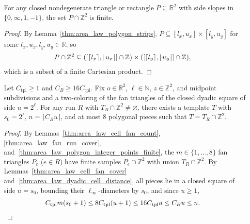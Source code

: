\begin{lemma}
    \label{thm:area_law_polygon_integer_points_finite}
    \leanok
    For any closed nondegenerate triangle or rectangle $P\subseteq\mathbb R^2$ with side slopes in $\{0,\infty,1,-1\}$, the set $P\cap\mathbb Z^2$ is finite.
\end{lemma}

\begin{proof}
    \leanok
    By Lemma~\ref{thm:area_law_polygon_strips}, $P\subseteq[l_x,u_x]\times[l_y,u_y]$ for some $l_x,u_x,l_y,u_y\in\mathbb R$, so
    \begin{align}
        P\cap\mathbb Z^2 & \subseteq
        ([\lceil l_x\rceil,\lfloor u_x\rfloor]\cap\mathbb Z)
        \times([\lceil l_y\rceil,\lfloor u_y\rfloor]\cap\mathbb Z),\notag
    \end{align}
    which is a subset of a finite Cartesian product.
\end{proof}

\begin{lemma}
    \label{thm:area_law_fan_run_template}
    \leanok
    Let $C_{\mathrm{tpl}}\ge1$ and $C_B\ge16C_{\mathrm{tpl}}$. Fix $o\in\mathbb R^2$, $\ell\in\mathbb N$, $z\in\mathbb Z^2$, and midpoint subdivisions and a two-coloring of the fan triangles of the closed dyadic square of side $u=2^\ell$. For any run $R$ with $T_R\cap\mathbb Z^2\ne\varnothing$, there exists a template $T$ with $s_0=2^\ell$, $n=\lceil C_Bu\rceil$, and at most $8$ polygonal pieces such that $T=T_R\cap\mathbb Z^2$.
\end{lemma}

\begin{proof}
    \leanok
    By Lemmas~\ref{thm:area_law_cell_fan_count}, \ref{thm:area_law_fan_run_cover}, and~\ref{thm:area_law_polygon_integer_points_finite}, the $m\in\{1,\ldots,8\}$ fan triangles $P_e$ ($e\in R$) have finite samples $P_e\cap\mathbb Z^2$ with union $T_R\cap\mathbb Z^2$. By Lemmas~\ref{thm:area_law_cell_fan_cover} and~\ref{thm:area_law_dyadic_cell_distance}, all pieces lie in a closed square of side $u=s_0$, bounding their $\ell_\infty$-diameters by $s_0$, and since $u\ge1$,
    \begin{align}
        C_{\mathrm{tpl}}m(s_0+1) & \le8C_{\mathrm{tpl}}(u+1)
        \le16C_{\mathrm{tpl}}u\le C_Bu\le n.\notag
    \end{align}
\end{proof}

